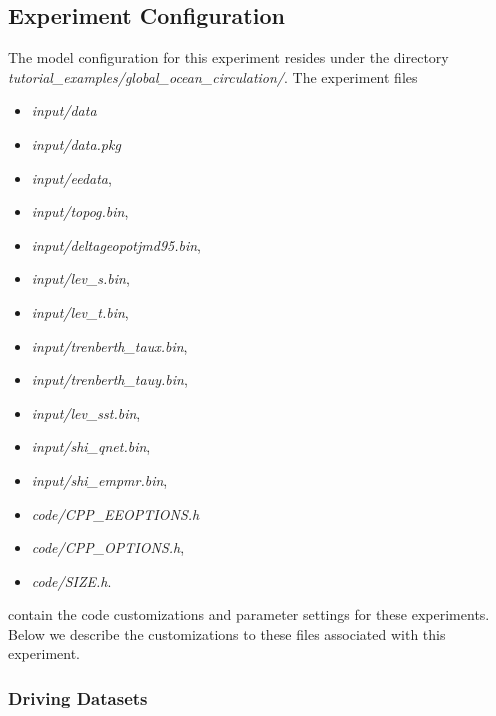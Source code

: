 \subsection{Experiment Configuration}
\label{sec:eg-globalpressure-config}

The model configuration for this experiment resides under the 
directory {\it tutorial\_examples/global\_ocean\_circulation/}.  
The experiment files 

\begin{itemize}
\item {\it input/data}
\item {\it input/data.pkg}
\item {\it input/eedata},
\item {\it input/topog.bin},
\item {\it input/deltageopotjmd95.bin},
\item {\it input/lev\_s.bin},
\item {\it input/lev\_t.bin},
\item {\it input/trenberth\_taux.bin},
\item {\it input/trenberth\_tauy.bin},
\item {\it input/lev\_sst.bin},
\item {\it input/shi\_qnet.bin},
\item {\it input/shi\_empmr.bin},
\item {\it code/CPP\_EEOPTIONS.h}
\item {\it code/CPP\_OPTIONS.h},
\item {\it code/SIZE.h}. 
\end{itemize}
contain the code customizations and parameter settings for these
experiments. Below we describe the customizations
to these files associated with this experiment.

\subsubsection{Driving Datasets}

